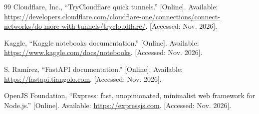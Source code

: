 \begin{thebibliography}{99}
Cloudflare, Inc., ``TryCloudflare quick tunnels.'' [Online]. Available: \url{https://developers.cloudflare.com/cloudflare-one/connections/connect-networks/do-more-with-tunnels/trycloudflare/}. [Accessed: Nov. 2026].

Kaggle, ``Kaggle notebooks documentation.'' [Online]. Available: \url{https://www.kaggle.com/docs/notebooks}. [Accessed: Nov. 2026].

S. Ram\'irez, ``FastAPI documentation.'' [Online]. Available: \url{https://fastapi.tiangolo.com}. [Accessed: Nov. 2026].

OpenJS Foundation, ``Express: fast, unopinionated, minimalist web framework for Node.js.'' [Online]. Available: \url{https://expressjs.com}. [Accessed: Nov. 2026].
\end{thebibliography}
